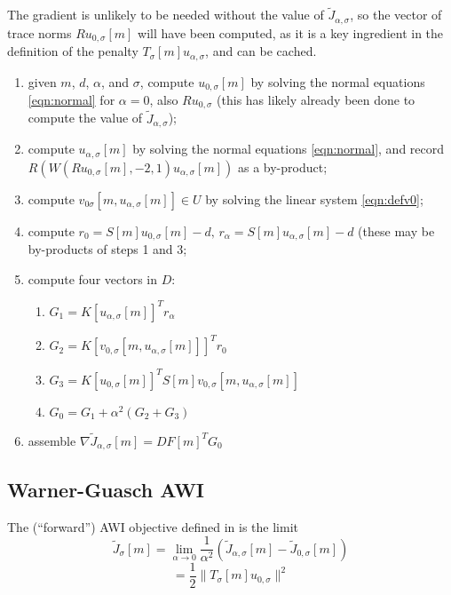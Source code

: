 The gradient is unlikely to be needed without the value
of $\tilde{J}_{\alpha,\sigma}$, so the vector of trace norms
$Ru_{0,\sigma}[m]$ will have been computed, as it is a key ingredient
in the definition of the penalty
$T_{\sigma}[m]u_{\alpha,\sigma}$, and can be
cached.

\begin{enumerate}
\item given $m$, $d$, $\alpha$, and $\sigma$, compute
  $u_{0,\sigma}[m]$ by solving the normal equations \ref{eqn:normal}
  for $\alpha=0$, also $Ru_{0,\sigma}$ (this has
  likely already been done to compute the value of $\tilde{J}_{\alpha,\sigma}$);
\item compute $u_{\alpha,\sigma}[m]$ by
  solving the normal equations \ref{eqn:normal}, and record
  $R(W(Ru_{0,\sigma}[m],-2,1)u_{\alpha,\sigma}[m])$ as a by-product;
\item compute $v_{0\sigma}[m, u_{\alpha,\sigma}[m]] \in U$ by solving the linear system
  \ref{eqn:defv0};
\item compute $r_0 = S[m]u_{0,\sigma}[m]-d,\,r_{\alpha} = S[m]u_{\alpha,\sigma}[m]-d$ (these may be by-products of steps 1 and 3;
\item compute four vectors in $D$:
  \begin{enumerate}
  \item $G_1 = K[u_{\alpha,\sigma}[m]]^T r_{\alpha}$
  \item $G_2 = K[v_{0,\sigma}[m, u_{\alpha,\sigma}[m]]]^Tr_0$
  \item $G_3 = K[u_{0,\sigma}[m]]^T S[m]v_{0,\sigma}[m, u_{\alpha,\sigma}[m]]$
  \item $G_0 = G_1 + \alpha^2 (G_2 + G_3)$
  \end{enumerate}
\item assemble
  $\nabla \tilde{J}_{\alpha,\sigma}[m] = DF[m]^TG_0$
\end{enumerate}

\subsection{Warner-Guasch AWI}
The (``forward'') AWI objective defined in \cite{Warner:16} is
the limit
\begin{equation}
  \label{eqn:wglim}
  \tilde{J}_{\sigma}[m] = \lim_{\alpha \rightarrow 0}
  \frac{1}{\alpha^2}(\tilde{J}_{\alpha,\sigma}[m]-\tilde{J}_{0,\sigma}[m])
\end{equation}
\begin{equation}
  \label{eqn:wg}
  = \frac{1}{2} \|T_{\sigma}[m]u_{0,\sigma}\|^2
\end{equation}

